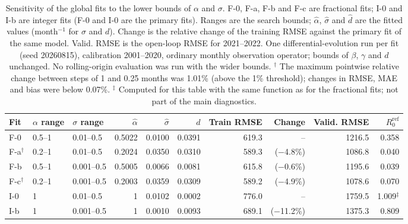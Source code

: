 \begin{table}[htbp]
\centering
\scriptsize
\caption{Sensitivity of the global fits to the lower bounds of $\alpha$ and $\sigma$. F-0, F-a, F-b and F-c are fractional fits; I-0 and I-b are integer fits (F-0 and I-0 are the primary fits). Ranges are the search bounds; $\hat\alpha$, $\hat\sigma$ and $\hat d$ are the fitted values (month$^{-1}$ for $\sigma$ and $d$). Change is the relative change of the training RMSE against the primary fit of the same model. Valid. RMSE is the open-loop RMSE for 2021--2022. One differential-evolution run per fit (seed 20260815), calibration 2001--2020, ordinary monthly observation operator; bounds of $\beta$, $\gamma$ and $d$ unchanged. No rolling-origin evaluation was run with the wider bounds. $^\dagger$ The maximum pointwise relative change between steps of 1 and 0.25 months was 1.01\% (above the 1\% threshold); changes in RMSE, MAE and bias were below 0.07\%. $^\ddagger$ Computed for this table with the same function as for the fractional fits; not part of the main diagnostics.}
\label{tab:sens}
\begingroup\setlength{\tabcolsep}{2pt}
\begin{tabular}{@{}lllrrrrrrr@{}}
\toprule
Fit & $\alpha$ range & $\sigma$ range & $\hat\alpha$ & $\hat\sigma$ & $\hat d$ & Train RMSE & Change & Valid. RMSE & $R_0^{\mathrm{ref}}$ \\
\midrule
F-0 & 0.5--1 & 0.01--0.5 & 0.5022 & 0.0100 & 0.0391 & 619.3 & -- & 1216.5 & 0.358 \\
F-a$^{\dagger}$ & 0.2--1 & 0.01--0.5 & 0.2024 & 0.0350 & 0.0310 & 589.3 & ($-$4.8\%) & 1086.8 & 0.040 \\
F-b & 0.5--1 & 0.001--0.5 & 0.5005 & 0.0066 & 0.0081 & 615.8 & ($-$0.6\%) & 1195.6 & 0.039 \\
F-c$^{\dagger}$ & 0.2--1 & 0.001--0.5 & 0.2003 & 0.0359 & 0.0309 & 589.2 & ($-$4.9\%) & 1078.6 & 0.070 \\
I-0 & 1 & 0.01--0.5 & 1 & 0.0102 & 0.0002 & 776.0 & -- & 1759.5 & 1.009$^{\ddagger}$ \\
I-b & 1 & 0.001--0.5 & 1 & 0.0010 & 0.0093 & 689.1 & ($-$11.2\%) & 1375.3 & 0.809 \\
\bottomrule
\end{tabular}
\endgroup
\end{table}
